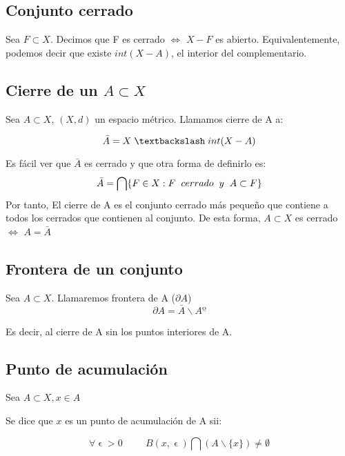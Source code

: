 \documentclass[11pt]{article}
\begin{document}
\subsection*{Conjunto cerrado}

Sea $F\subset X$. Decimos que F es cerrado $\Leftrightarrow$ $X-F$ es abierto.
Equivalentemente, podemos decir que existe $int(X-A)$, el interior del complementario.



\subsection*{Cierre de un $A \subset X$}

Sea $A \subset X$, $(X,d)$ un espacio métrico. Llamamos cierre de A a:

\[
\bar{A} = X \hspace{0.1cm}\textbackslash \hspace{0.1cm} int(X-A)
\]

Es fácil ver que $\bar{A}$ es cerrado y que otra forma de definirlo es:
\[
\bar{A} = \bigcap \{F\in X: F \hspace{0.2cm} cerrado \hspace{0.2cm}y \hspace{0.2cm} A\subset F\}
\]
Por tanto, El cierre de A es el conjunto cerrado más pequeño que contiene a todos los cerrados que contienen al conjunto. De esta forma, $A\subset X$ es cerrado $\Leftrightarrow$ $A = \bar{A}$



\subsection*{Frontera de un conjunto}

Sea $A\subset X$. Llamaremos frontera de A ($\partial A$)
\[
\partial A = \bar{A} \backslash Aº
\]

Es decir, al cierre de A sin los puntos interiores de A.


\subsection*{Punto de acumulación}

Sea $A \subset X, x \in A$

Se dice que $x$ es un punto de acumulación de A sii:

\[
\forall \upvarepsilon > 0 \hspace{1cm} B(x,\upvarepsilon)\bigcap(A\backslash \{x\}) \neq \emptyset
\]
\end{document}
